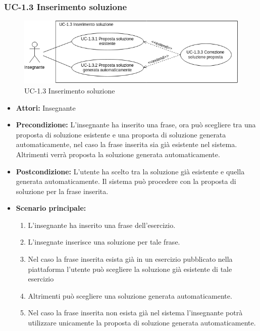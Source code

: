 \subsubsection{UC-1.3 Inserimento soluzione}
\begin{figure}[htbp]
	\centering
	\includegraphics[scale=0.7]{images/UC-1_3.png}
	\caption{UC-1.3 Inserimento soluzione}
\end{figure}
\begin{itemize}
\item \textbf{Attori: }Insegnante

\item \textbf{Precondizione: }L'insegnante ha inserito una frase, ora può scegliere tra una proposta di soluzione esistente e una proposta di soluzione generata automaticamente, nel caso la frase inserita sia già esistente nel sistema. Altrimenti verrà proposta la soluzione generata automaticamente.
\item \textbf{Postcondizione: }L'utente ha scelto tra la soluzione già esistente e quella generata automaticamente. Il sistema può procedere con la proposta di soluzione per la frase inserita.
\item \textbf{Scenario principale: }
		\begin{enumerate}
		\item L'insegnante ha inserito una frase dell'esercizio.
		\item L'insegnate inserisce una soluzione per tale frase. 
		\item Nel caso la frase inserita esista già in un esercizio pubblicato nella piattaforma l'utente può scegliere la soluzione già esistente di tale esercizio
		\item Altrimenti può scegliere una soluzione generata automaticamente. 
		\item Nel caso la frase inserita non esista già nel sistema l'insegnante potrà utilizzare unicamente la proposta di soluzione generata automaticamente.
		\end{enumerate}
		

\end{itemize}
